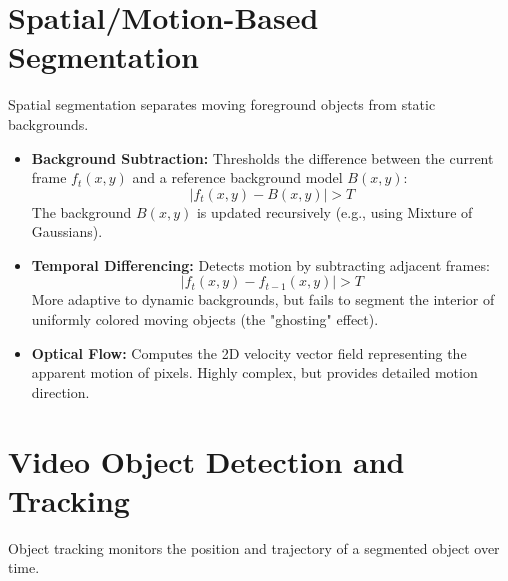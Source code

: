 \documentclass[12pt,a4paper]{article}
\begin{document}
\section{Spatial/Motion-Based Segmentation}

Spatial segmentation separates moving foreground objects from static backgrounds.

\begin{itemize}[leftmargin=*, itemsep=3.5pt]
  \item \textbf{Background Subtraction:} Thresholds the difference between the current frame $f_t(x,y)$ and a reference background model $B(x,y)$:
    \begin{equation}
      |f_t(x,y) - B(x,y)| > T
    \end{equation}
    The background $B(x,y)$ is updated recursively (e.g., using Mixture of Gaussians).
  \item \textbf{Temporal Differencing:} Detects motion by subtracting adjacent frames:
    \begin{equation}
      |f_t(x,y) - f_{t-1}(x,y)| > T
    \end{equation}
    More adaptive to dynamic backgrounds, but fails to segment the interior of uniformly colored moving objects (the "ghosting" effect).
  \item \textbf{Optical Flow:} Computes the 2D velocity vector field representing the apparent motion of pixels. Highly complex, but provides detailed motion direction.
\end{itemize}

\section{Video Object Detection and Tracking}

Object tracking monitors the position and trajectory of a segmented object over time.
\end{document}
